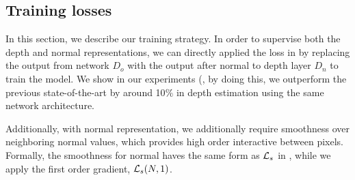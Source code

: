 

\subsection{Training losses}
\label{sub:training_losses}
In this section, we describe our training strategy. In order to supervise both the depth and normal representations, we can directly applied the loss in  by replacing the output from network $D_o$ with the output after normal to depth layer $D_n$ to train the model. We show in our experiments (, by doing this, we outperform the previous state-of-the-art by around 10$\%$ in depth estimation using the same network architecture.

Additionally, with normal representation, we additionally require smoothness over neighboring normal values, which provides high order interactive between pixels. Formally, the smoothness for normal haves the same form as ${\mathcal L}_{s}$ in , while we apply the first order gradient, \ie ${\mathcal L}_{s}(N, 1)$. 

